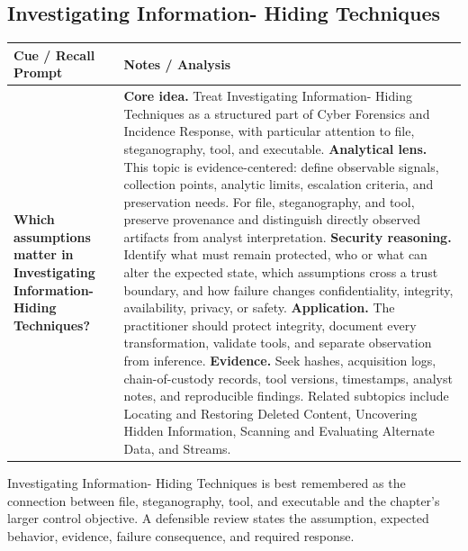 \documentclass[11pt]{article}
\newcommand{\CornellHeader}{%
\rowcolor{Navy}\color{white}\bfseries Cue / Recall Prompt & \color{white}\bfseries Notes / Analysis\\\hline}
\newcommand{\CornellRow}[2]{%
\cellcolor{CueGray}\RaggedRight\textbf{#1} & \RaggedRight #2\\\hline}
\begin{document}
\subsection*{Investigating Information- Hiding Techniques}
\begin{longtable}{>{\RaggedRight\arraybackslash}p{}|>{\RaggedRight\arraybackslash}p{}}
\CornellHeader
\CornellRow{Which assumptions matter in Investigating Information- Hiding Techniques?}{\textbf{Core idea.} Treat Investigating Information- Hiding Techniques as a structured part of Cyber Forensics and Incidence Response, with particular attention to file, steganography, tool, and executable. \textbf{Analytical lens.} This topic is evidence-centered: define observable signals, collection points, analytic limits, escalation criteria, and preservation needs. For file, steganography, and tool, preserve provenance and distinguish directly observed artifacts from analyst interpretation. \textbf{Security reasoning.} Identify what must remain protected, who or what can alter the expected state, which assumptions cross a trust boundary, and how failure changes confidentiality, integrity, availability, privacy, or safety. \textbf{Application.} The practitioner should protect integrity, document every transformation, validate tools, and separate observation from inference. \textbf{Evidence.} Seek hashes, acquisition logs, chain-of-custody records, tool versions, timestamps, analyst notes, and reproducible findings. Related subtopics include Locating and Restoring Deleted Content, Uncovering Hidden Information, Scanning and Evaluating Alternate Data, and Streams.}
\end{longtable}
\begin{topicsummary}
Investigating Information- Hiding Techniques is best remembered as the connection between file, steganography, tool, and executable and the chapter's larger control objective. A defensible review states the assumption, expected behavior, evidence, failure consequence, and required response.
\end{topicsummary}
\end{document}
